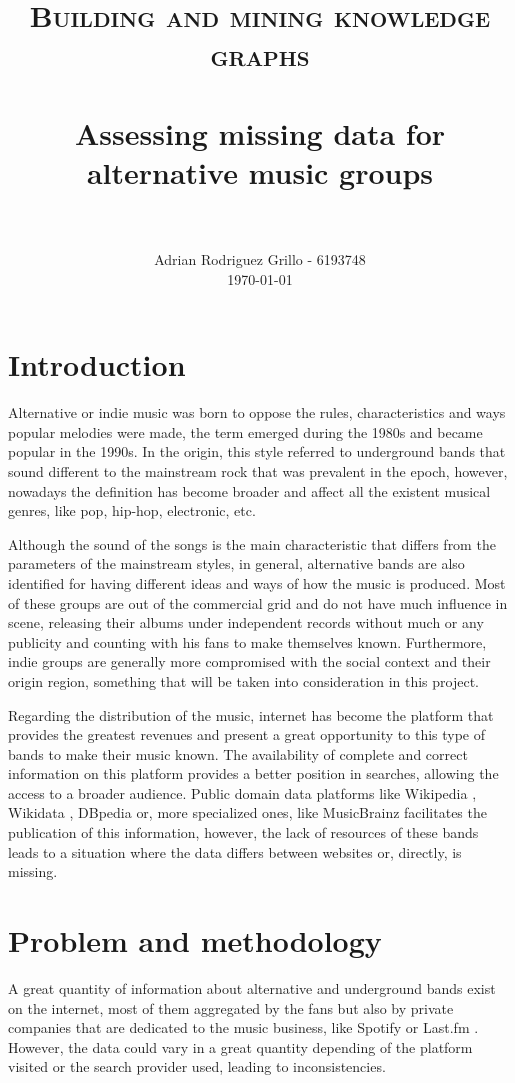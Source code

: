 \documentclass[paper=a4,fontsize=11pt]{scrartcl}
\title{
		\usefont{OT1}{bch}{b}{n}
		\normalfont \normalsize \textsc{Building and mining knowledge graphs} \\ [25pt]
		\horrule{0.5pt} \\[0.4cm]
		\huge Assessing missing data for alternative music groups \\
		\horrule{2pt} \\[0.5cm]
}
\author{
		\normalfont 								\normalsize
        Adrian Rodriguez Grillo - 6193748\\[-3pt]		\normalsize
        \today
}
\date{}
\numberwithin{equation}{section}		%
\numberwithin{figure}{section}			%
\numberwithin{table}{section}				%
\begin{document}
\maketitle
\section{Introduction}

Alternative or indie music was born to oppose the rules, characteristics and ways popular melodies were made, the term emerged during the 1980s and became popular in the 1990s.
In the origin, this style referred to underground bands that sound different to the mainstream rock that was prevalent in the epoch, however, nowadays the definition has become broader and affect all the existent musical genres, like pop, hip-hop, electronic, etc.

Although the sound of the songs is the main characteristic that differs from the parameters of the mainstream styles, in general, alternative bands are also identified for having different ideas and ways of how the music is produced. 
Most of these groups are out of the commercial grid and do not have much influence in scene, releasing their albums under independent records without much or any publicity and counting with his fans to make themselves known. 
Furthermore, indie groups are generally more compromised with the social context and their origin region, something that will be taken into consideration in this project.

Regarding the distribution of the music, internet has become the platform that provides the greatest revenues \cite{music_report_2018} and present a great opportunity to this type of bands to make their music known. 
The availability of complete and correct information on this platform provides a better position in searches, allowing the access to a broader audience. 
Public domain data platforms like Wikipedia \cite{wikipedia}, Wikidata \cite{wikidata}, DBpedia \cite{dbpedia} or, more specialized ones, like MusicBrainz \cite{musicbrainz} facilitates the publication of this information, however, the lack of resources of these bands leads to a situation where the data differs between websites or, directly, is missing.

\section{Problem and methodology}
A great quantity of information about alternative and underground bands exist on the internet, most of them aggregated by the fans but also by private companies that are dedicated to the music business, like Spotify \cite{spotify} or Last.fm \cite{lastfm}.
However, the data could vary in a great quantity depending of the platform visited or the search provider used, leading to inconsistencies. 
\end{document}
